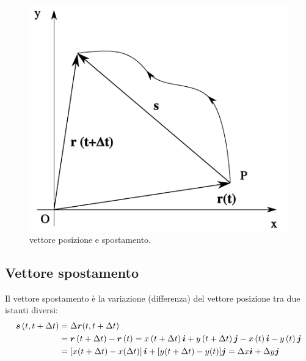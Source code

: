 \begin{figure}[htbp]
  \centering
  \includegraphics[scale=0.7]{immagini/fisica1/vettore_posizione}
  \caption{vettore posizione e spostamento.}
\end{figure}
\subsection{Vettore spostamento}
\begin{Def}
  Il  vettore spostamento è la variazione (differenza) del vettore posizione tra due istanti diversi:
  \begin{align*}
    \boldsymbol{s}\left(t,t+\Delta t\right) & =\Delta \boldsymbol{r}(t,t+\Delta t)                                                                                                                             \\
                                   & =\boldsymbol{r}\left(t+\Delta t\right)-\boldsymbol{r}\left(t\right)=x\left(t+\Delta t\right)\boldsymbol{i}+y\left(t+\Delta t\right)\boldsymbol{j}-x\left(t\right)\boldsymbol{i}-y\left(t\right)\boldsymbol{j} \\
                                   & =\left[x(t+\Delta t)-x(\Delta t)\right]\boldsymbol{i}+[y(t+\Delta t)-y(t)]\boldsymbol{j}=\Delta x\boldsymbol{i}+\Delta y \boldsymbol{j}
  \end{align*}
\end{Def}
